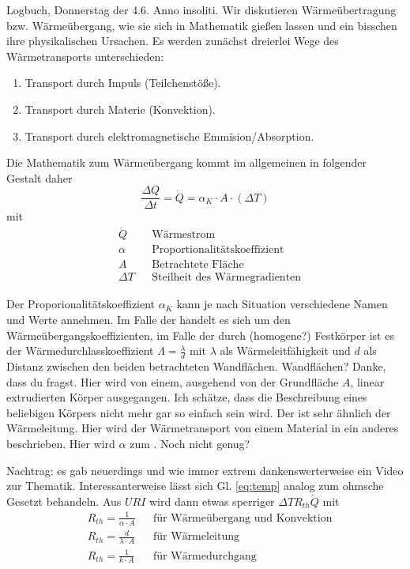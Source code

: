 Logbuch, Donnerstag der 4.6. Anno insoliti.\absatzmid
Wir diskutieren Wärmeübertragung bzw. Wärmeübergang, wie sie sich in Mathematik gießen lassen und ein bisschen ihre physikalischen Ursachen.
Es werden zunächst dreierlei Wege des Wärmetransports unterschieden:
\begin{enumerate}
    \item Transport durch Impuls (Teilchenstöße).
    \item Transport durch Materie (Konvektion).
    \item Transport durch elektromagnetische Emmision/Absorption.
\end{enumerate}

Die Mathematik zum Wärmeübergang kommt im allgemeinen in folgender Gestalt daher
\begin{equation} \label{eq:temp}
    \frac{\Delta Q}{\Delta t} = \dot{Q} = \alpha_K \cdot A \cdot (\Delta T)
\end{equation}
mit
\begin{align*}
    &\dot{Q} & &\text{Wärmestrom}\\
    &\alpha  & &\text{Proportionalitätskoeffizient}\\
    &A         & &\text{Betrachtete Fläche}\\
    &\Delta T  & &\text{Steilheit des Wärmegradienten}
\end{align*}

Der Proporionalitätskoeffizient \(\alpha_K\) kann je nach Situation verschiedene Namen und Werte annehmen. Im Falle
der  handelt es sich um den Wärmeübergangskoeffizienten, im Falle der  durch
(homogene?) Festkörper ist es der Wärmedurchlasskoeffizient \(\Lambda = \frac{\lambda}{d}\) mit \(\lambda\) als Wärmeleitfähigkeit und \(d\) als
Distanz zwischen den beiden betrachteten Wandflächen. Wandflächen? Danke, dass du fragst. Hier wird von einem,
ausgehend von der Grundfläche \(A\), linear extrudierten Körper ausgegangen. Ich schätze, dass die Beschreibung eines
beliebigen Körpers nicht mehr gar so einfach sein wird. Der  ist sehr ähnlich der Wärmeleitung.
Hier wird der Wärmetransport von einem Material in ein anderes beschrieben. Hier wird \(\alpha\) zum .
Noch nicht genug? \par\medskip

Nachtrag: es gab neuerdings und wie immer extrem dankenswerterweise ein Video zur Thematik.
Interessanterweise lässt sich Gl. \ref{eq:temp} analog zum ohmsche Gesetzt behandeln. Aus \(U R I\) wird dann etwas sperriger \(\Delta T R_{th} \dot{Q}\)
mit
\begin{align*}
    &R_{th} = \frac{1}{\alpha \cdot A} & &\text{für Wärmeübergang und Konvektion}\\
    &R_{th} = \frac{d}{\lambda \cdot A} & &\text{für Wärmeleitung}\\
    &R_{th} = \frac{1}{k \cdot A} & &\text{für Wärmedurchgang}
\end{align*}